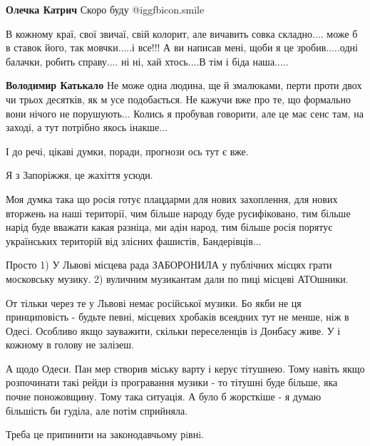 \begin{itemize}
\begin{itemize} %
\textbf{Олечка Катрич} Скоро буду  @igg{fbicon.smile} 
\end{itemize} %


В кожному краї, свої звичаї, свій колорит, але вичавить совка складно.... може
б в ставок його, так мовчки.....і все!!! А ви написав мені, щоби я це
зробив.....одні балачки, робить справу.... ні ні, хай хтось....В тім і біда
наша.....

\begin{itemize} %
\textbf{Володимир Катькало} Не може одна людина, ще й змалюками, перти проти двох чи трьох десятків, як м усе подобається. Не кажучи вже про те, що формально вони нічого не порушують... Колись я пробував говорити, але це має сенс там, на заході, а тут потрібно якось інакше...

І до речі, цікаві думки, поради, прогнози ось тут є вже.
\end{itemize} %

Я з Запоріжжя, це жахіття усюди.


Моя думка така що росія готує плацдарми для нових захоплення, для нових
вторжень на наші території, чим більше народу буде русифіковано, тим більше
нарід буде вважати какая разніца, ми адін народ, тим більше росія порятує
українських територій від злісних фашистів, Бандерівців...


Просто 1) У Львові місцева рада ЗАБОРОНИЛА у публічних місцях грати московську
музику. 2) вуличним музикантам дали по пиці місцеві АТОшники.

От тільки через те у Львові немає російської музики. Бо якби не ця
принциповість - будьте певні, місцевих хробаків всеядних тут не менше, ніж в
Одесі. Особливо якщо зауважити, скільки переселенців із Донбасу живе. У і
кожному в голову не залізеш.

А щодо Одеси. Пан мер створив міську варту і керує тітушнею. Тому навіть якщо
розпочинати такі рейди із програвання музики - то тітушні буде більше, яка
почне поножовщину. Тому така ситуація. А було б жорсткіше - я думаю більшість
би гуділа, але потім сприйняла.

Треба це припинити на законодавчьому рiвнi.



\end{itemize}

